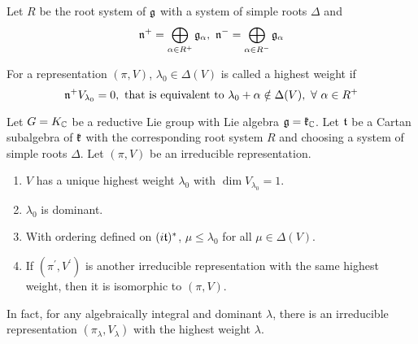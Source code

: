 \documentclass[a4paper,12pt]{article}
\begin{document}
	Let $R$ be the root system of $\mathfrak{g}$ with a system of simple roots $\Delta$ and 
	\begin{equation*}
		\mathfrak{n}^+ = \bigoplus_{\alpha \in R^+}\mathfrak{g}_{\alpha},~\mathfrak{n}^- = \bigoplus_{\alpha \in R^-}\mathfrak{g}_{\alpha}
	\end{equation*}
	\begin{defn}
		For a representation $(\pi,V)$, $\lambda_0 \in \Delta(V)$ is called a highest weight if
		\begin{equation*}
			\mathfrak{n}^+V_{\lambda_0} = 0,\text{ that is equivalent to } \lambda_0+\alpha \notin \Delta(V),~\forall~\alpha \in R^+
		\end{equation*}
	\end{defn}

	\begin{thm}
		Let $G=K_{\mathbb{C}}$ be a reductive Lie group with Lie algebra $\mathfrak{g} = \mathfrak{k}_{\mathbb{C}}$. Let $\mathfrak{t}$ be a Cartan subalgebra of $\mathfrak{k}$ with the corresponding root system $R$ and choosing a system of simple roots $\Delta$. Let $(\pi,V)$ be an irreducible representation.
		\begin{enumerate}
			\item $V$ has a unique highest weight $\lambda_0$ with $\dim V_{\lambda_0} = 1$.
			\item $\lambda_0$ is dominant.
			\item With ordering defined on $(i\mathfrak{t})^*$, $\mu \leqslant \lambda_0$ for all $\mu \in \Delta(V)$.
			\item If $(\pi^{\prime},V^{\prime})$ is another irreducible representation with the same highest weight, then it is isomorphic to $(\pi,V)$.
		\end{enumerate}
	\end{thm}
	\begin{rem}
		In fact, for any algebraically integral and dominant $\lambda$, there is an irreducible representation $(\pi_{\lambda},V_{\lambda})$ with the highest weight $\lambda$.
	\end{rem}
\end{document}
